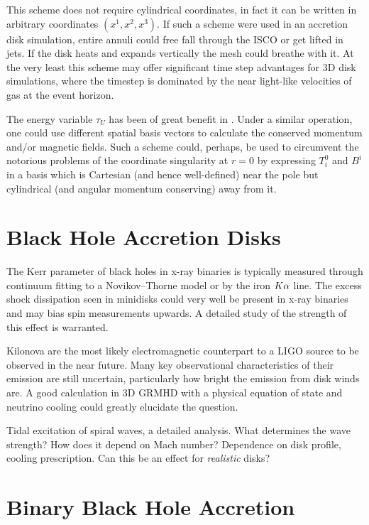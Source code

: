This scheme does not require cylindrical coordinates, in fact it can be written in arbitrary coordinates $(x^1, x^2, x^3)$.  If such a scheme were used in an accretion disk simulation, entire annuli could free fall through the ISCO or get lifted in jets.  If the disk heats and expands vertically the mesh could breathe with it.  At the very least this scheme may offer significant time step advantages for 3D disk simulations, where the timestep is dominated by the near light-like velocities of gas at the event horizon.

The energy variable $\tau_U$ has been of great benefit in \grdisco.  Under a similar operation, one could use different spatial basis vectors to calculate the conserved momentum and/or magnetic fields.  Such a scheme could, perhaps, be used to circumvent the notorious problems of the coordinate singularity at $r=0$ by expressing $T^0_i$ and $B^i$ in a basis which is Cartesian (and hence well-defined) near the pole but cylindrical (and angular momentum conserving) away from it.

\section{Black Hole Accretion Disks}

The Kerr parameter of black holes in x-ray binaries is typically measured through continuum fitting to a Novikov--Thorne model or by the iron $K\alpha$ line.  The excess shock dissipation seen in minidisks could very well be present in x-ray binaries and may bias spin measurements upwards.  A detailed study of the strength of this effect is warranted.

Kilonova are the most likely electromagnetic counterpart to a LIGO source to be observed in the near future. Many key observational characteristics of their emission are still uncertain, particularly how bright the emission from disk winds are.  A good calculation in 3D GRMHD with a physical equation of state and neutrino cooling could greatly elucidate the question.

Tidal excitation of spiral waves, a detailed analysis.  What determines the wave strength? How does it depend on Mach number? Dependence on disk profile, cooling prescription.  Can this be an effect for \emph{realistic} disks?

\section{Binary Black Hole Accretion}

